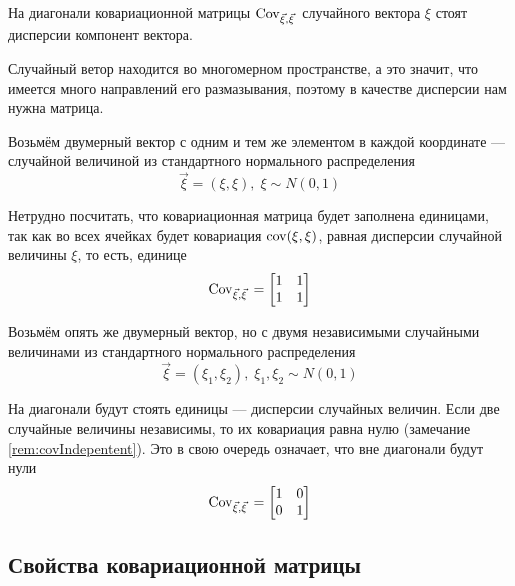 \begin{remark}
    На диагонали ковариационной матрицы $\operatorname{Cov}_{\vec{\xi}, \vec{\xi}}\,$
    случайного вектора $\xi$ стоят дисперсии компонент вектора.
\end{remark}

Случайный ветор находится во многомерном пространстве, а это значит,
что имеется много направлений его размазывания, поэтому в качестве дисперсии
нам нужна матрица.

\begin{example}
    Возьмём двумерный вектор с одним и тем же элементом
    в каждой координате --- случайной величиной из стандартного нормального
    распределения
    $$\vec{\xi} = \left( \xi, \xi \right),\; \xi \sim N\left( 0, 1 \right)$$

    Нетрудно посчитать, что ковариационная матрица будет заполнена единицами,
    так как во всех ячейках будет ковариация $\operatorname{cov}\!\left( \xi, \xi \right)$, равная
    дисперсии случайной величины $\xi$, то есть, единице
    $$\operatorname{Cov}_{\vec{\xi}, \vec{\xi}}\, =
    \begin{bmatrix}
        1 & 1 \\
        1 & 1
    \end{bmatrix}$$
\end{example}

\begin{example}
    Возьмём опять же двумерный вектор, но с двумя независимыми
    случайными величинами из стандартного нормального распределения
    $$\vec{\xi} = \left( \xi_1, \xi_2 \right),\;
        \xi_1, \xi_2 \sim N\left( 0, 1 \right)$$

    На диагонали будут стоять единицы --- дисперсии случайных величин.
    Если две случайные величины независимы, то их ковариация равна нулю
    (замечание \ref{rem:covIndepentent}).
    Это в свою очередь означает, что вне диагонали
    будут нули
    $$\operatorname{Cov}_{\vec{\xi}, \vec{\xi}}\, =
    \begin{bmatrix}
        1 & 0 \\
        0 & 1
    \end{bmatrix}$$
\end{example}

\subsection{Свойства ковариационной матрицы}

